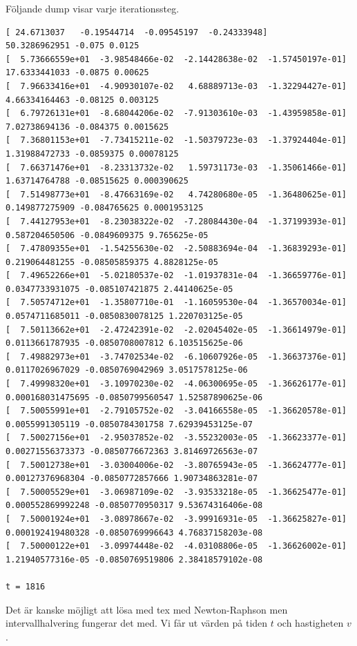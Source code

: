 \documentclass[11pt,twoside]{article}
\begin{document}
Följande dump visar varje iterationssteg. 
\begin{lstlisting}
[ 24.6713037   -0.19544714  -0.09545197  -0.24333948]
50.3286962951 -0.075 0.0125
[  5.73666559e+01  -3.98548466e-02  -2.14428638e-02  -1.57450197e-01]
17.6333441033 -0.0875 0.00625
[  7.96633416e+01  -4.90930107e-02   4.68889713e-03  -1.32294427e-01]
4.66334164463 -0.08125 0.003125
[  6.79726131e+01  -8.68044206e-02  -7.91303610e-03  -1.43959858e-01]
7.02738694136 -0.084375 0.0015625
[  7.36801153e+01  -7.73415211e-02  -1.50379723e-03  -1.37924404e-01]
1.31988472733 -0.0859375 0.00078125
[  7.66371476e+01  -8.23313732e-02   1.59731173e-03  -1.35061466e-01]
1.63714764788 -0.08515625 0.000390625
[  7.51498773e+01  -8.47663169e-02   4.74280680e-05  -1.36480625e-01]
0.149877275909 -0.084765625 0.0001953125
[  7.44127953e+01  -8.23038322e-02  -7.28084430e-04  -1.37199393e-01]
0.587204650506 -0.0849609375 9.765625e-05
[  7.47809355e+01  -1.54255630e-02  -2.50883694e-04  -1.36839293e-01]
0.219064481255 -0.08505859375 4.8828125e-05
[  7.49652266e+01  -5.02180537e-02  -1.01937831e-04  -1.36659776e-01]
0.0347733931075 -0.085107421875 2.44140625e-05
[  7.50574712e+01  -1.35807710e-01  -1.16059530e-04  -1.36570034e-01]
0.0574711685011 -0.0850830078125 1.220703125e-05
[  7.50113662e+01  -2.47242391e-02  -2.02045402e-05  -1.36614979e-01]
0.0113661787935 -0.0850708007812 6.103515625e-06
[  7.49882973e+01  -3.74702534e-02  -6.10607926e-05  -1.36637376e-01]
0.0117026967029 -0.0850769042969 3.0517578125e-06
[  7.49998320e+01  -3.10970230e-02  -4.06300695e-05  -1.36626177e-01]
0.000168031475695 -0.0850799560547 1.52587890625e-06
[  7.50055991e+01  -2.79105752e-02  -3.04166558e-05  -1.36620578e-01]
0.0055991305119 -0.0850784301758 7.62939453125e-07
[  7.50027156e+01  -2.95037852e-02  -3.55232003e-05  -1.36623377e-01]
0.00271556373373 -0.0850776672363 3.81469726563e-07
[  7.50012738e+01  -3.03004006e-02  -3.80765943e-05  -1.36624777e-01]
0.00127376968304 -0.0850772857666 1.90734863281e-07
[  7.50005529e+01  -3.06987109e-02  -3.93533218e-05  -1.36625477e-01]
0.000552869992248 -0.0850770950317 9.53674316406e-08
[  7.50001924e+01  -3.08978667e-02  -3.99916931e-05  -1.36625827e-01]
0.000192419480328 -0.0850769996643 4.76837158203e-08
[  7.50000122e+01  -3.09974448e-02  -4.03108806e-05  -1.36626002e-01]
1.21940577316e-05 -0.0850769519806 2.38418579102e-08

t = 1816
\end{lstlisting}

Det är kanske möjligt att lösa med tex med Newton-Raphson men intervallhalvering fungerar det med. Vi får ut värden på tiden $t$ och hastigheten $v$.
\end{document}
